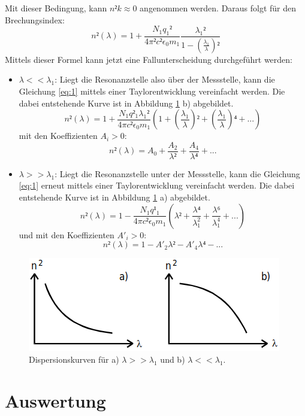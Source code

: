 Mit dieser Bedingung, kann $n²k \approx 0$ angenommen werden. Daraus folgt für den Brechungsindex:
\begin{equation}
  \label{eq:1}
  n²(\lambda)=1+ \frac{N_1 q_1²}{4\pi² c² \epsilon_0 m_1} \frac{\lambda_1²}{{1-\left(\frac{\lambda_1}{\lambda}\right)²}}
\end{equation}
Mittels dieser Formel kann jetzt eine Fallunterscheidung durchgeführt werden:
\begin{itemize}
  \item $\lambda << \lambda_1$: Liegt die Resonanzstelle also über der Messstelle, kann die Gleichung \eqref{eq:1} mittels einer Taylorentwicklung vereinfacht
  werden. Die dabei entstehende Kurve ist in Abbildung \ref{abb:2} b) abgebildet.
  \begin{equation*}
    n²(\lambda) = 1+\frac{N_1 q²_1 \lambda_1²}{4 \pi c² \epsilon_0 m_1} \left(1+\left(\frac{\lambda_1}{\lambda}\right)²+\left(\frac{\lambda_1}{\lambda}\right)⁴+ ...\right)
  \end{equation*}
  mit den Koeffizienten $A_i>0$:
  \begin{equation*}
    n²(\lambda) = A_0 + \frac{A_2}{\lambda²}+\frac{A_4}{\lambda⁴}+...
  \end{equation*}
  \item $\lambda >> \lambda_1$: Liegt die Resonanzstelle unter der Messstelle, kann die Gleichung \eqref{eq:1} erneut mittels einer Taylorentwicklung vereinfacht
  werden. Die dabei entstehende Kurve ist in Abbildung \ref{abb:2} a) abgebildet.
  \begin{equation*}
      n²(\lambda) = 1-\frac{N_1 q¹_1}{4 \pi c² \epsilon_0 m_1} \left(\lambda²+\frac{\lambda⁴}{\lambda_1^2}+\frac{\lambda⁶}{\lambda_1^4}+...\right)
  \end{equation*}
  und mit den Koeffizienten $A'_i>0$:
  \begin{equation*}
    n²(\lambda) = 1-A'_2\lambda²-A'_4\lambda⁴-...
  \end{equation*}
\end{itemize}
\FloatBarrier
\begin{figure}
  \centering
  \includegraphics[scale=0.6]{2.png}
  \caption{Dispersionskurven für a) $\lambda >> \lambda_1$ und b) $\lambda << \lambda_1$. \cite{Q1}}
  \label{abb:2}
\end{figure}
\FloatBarrier
\section{Auswertung}
